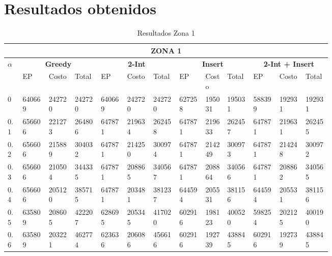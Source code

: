 \documentclass[conference]{IEEEtran}
\begin{document}
\clearpage
\begin{table*}[t]
\section{Resultados obtenidos}
\caption{Resultados Zona 1}
\begin{tabular}{|p{0.03\linewidth}|p{0.06\linewidth}|p{0.06\linewidth}|p{0.06\linewidth}|p{0.06\linewidth}|p{0.06\linewidth}|p{0.06\linewidth}|p{0.06\linewidth}|p{0.05\linewidth}|p{0.06\linewidth}|p{0.06\linewidth}|p{0.06\linewidth}|p{0.06\linewidth}|}
\hline
\multicolumn{13}{|c|}{\textbf{ZONA 1}} \\ 
\hline

\multirow{2}{*}{\textbf{$\alpha$}}  & \multicolumn{3}{|c|}{\textbf{Greedy}} & \multicolumn{3}{|c|}{\textbf{2-Int}} & \multicolumn{3}{|c|}{\textbf{Insert}} & \multicolumn{3}{|c|}{\textbf{2-Int + Insert}} \\

\cline{2-13}
 & EP & Costo & Total & EP & Costo & Total & EP & Costo & Total & EP & Costo & Total  \\
\hline

0 & 640669 & 242720 & 242720 & 640669 & 242720 & 242720 & 627258 & 195031 & 195031 & 588399 & 192931 & 192931  \\
\hline

0.1 & 656606 & 221273 & 264806 & 647871 & 219634 & 262458 & 647871 & 219633 & 262457 & 647871 & 219631 & 262455  \\
\hline

0.2 & 656606 & 215889 & 304032 & 647871 & 214250 & 300974 & 647871 & 214249 & 300973 & 647871 & 214248 & 300972  \\
\hline

0.3 & 656606 & 210504 & 344335 & 647871 & 208865 & 340567 & 647871 & 208864 & 340566 & 647871 & 208862 & 340565  \\
\hline

0.4 & 656606 & 205120 & 385715 & 647871 & 203481 & 381237 & 644594 & 205531 & 381156 & 644594 & 205531 & 381156  \\
\hline

0.5 & 635809 & 208605 & 422207 & 628695 & 205345 & 417020 & 602916 & 198123 & 400520 & 598254 & 202125 & 400190  \\
\hline

0.6 & 635809 & 203221 & 462774 & 623636 & 206086 & 456616 & 602916 & 192739 & 438845 & 602916 & 192739 & 438845  \\
\hline


\end{tabular}
\end{table*}
\end{document}
